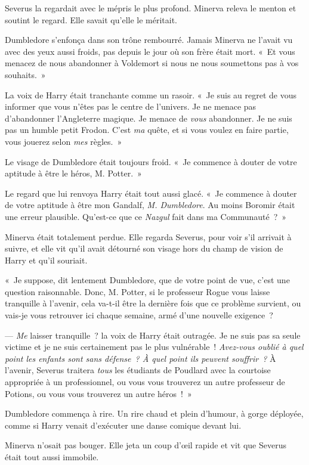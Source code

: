 Severus la regardait avec le mépris le plus profond. Minerva releva le menton et soutint le regard. Elle savait qu'elle le méritait.

Dumbledore s'enfonça dans son trône rembourré. Jamais Minerva ne l'avait vu avec des yeux aussi froids, pas depuis le jour où son frère était mort. «~Et vous menacez de nous abandonner à Voldemort si nous ne nous soumettons pas à vos souhaits.~»

La voix de Harry était tranchante comme un rasoir. «~Je suis au regret de vous informer que vous n'êtes pas le centre de l'univers. Je ne menace pas d'abandonner l'Angleterre magique. Je menace de \emph{vous} abandonner. Je ne suis pas un humble petit Frodon. C'est \emph{ma} quête, et si vous voulez en faire partie, vous jouerez selon \emph{mes} règles.~»

Le visage de Dumbledore était toujours froid. «~Je commence à douter de votre aptitude à être le héros, M. Potter.~»

Le regard que lui renvoya Harry était tout aussi glacé. «~Je commence à douter de votre aptitude à être mon Gandalf, \emph{M. Dumbledore}. Au moins Boromir était une erreur plausible. Qu'est-ce que ce \emph{Nazgul} fait dans ma Communauté~?~»

Minerva était totalement perdue. Elle regarda Severus, pour voir s'il arrivait à suivre, et elle vit qu'il avait détourné son visage hors du champ de vision de Harry et qu'il souriait.

«~Je suppose, dit lentement Dumbledore, que de votre point de vue, c'est une question raisonnable. Donc, M. Potter, si le professeur Rogue vous laisse tranquille à l'avenir, cela va-t-il être la dernière fois que ce problème survient, ou vais-je vous retrouver ici chaque semaine, armé d'une nouvelle exigence~?

--- \emph{Me} laisser tranquille~? la voix de Harry était outragée. Je ne suis pas sa seule victime et je ne suis certainement pas le plus vulnérable~! \emph{Avez-vous oublié à quel point les enfants sont sans défense~? À quel point ils peuvent souffrir~?} À l'avenir, Severus traitera \emph{tous} les étudiants de Poudlard avec la courtoise appropriée à un professionnel, ou vous vous trouverez un autre professeur de Potions, ou vous vous trouverez un autre héros~!~»

Dumbledore commença à rire. Un rire chaud et plein d'humour, à gorge déployée, comme si Harry venait d'exécuter une danse comique devant lui.

Minerva n'osait pas bouger. Elle jeta un coup d'œil rapide et vit que Severus était tout aussi immobile.

